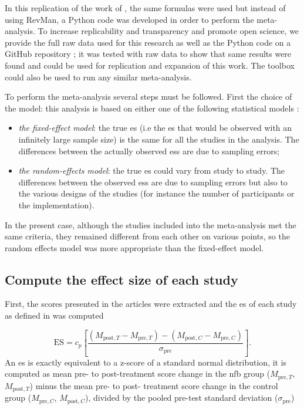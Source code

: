 \documentclass[12pt,a4paper,english]{article}
\begin{document}
In this replication of the work of \citeauthor{Cortese2016}, the same formulas were used \citep{Borenstein2009} but instead of using RevMan, 
a Python code was developed in order to perform the meta-analysis. To increase replicability and transparency and promote open science, we 
provide the full raw data used for this research as well as the Python code on a GitHub repository \citep{Bussalb2018}; it was tested
with \citet{Cortese2016} raw data to show that same results were found and could be used for replication and expansion of this work. The toolbox
could also be used to run any similar meta-analysis. 

To perform the meta-analysis several steps must be followed. First the choice of the model: this analysis is based on either one of the following 
statistical models \citep{Borenstein2009}:
\begin{itemize}
    \item \emph{the fixed-effect model}: the true \gls{es} (i.e the \gls{es} that would be observed with an infinitely 
		large sample size) is the same for all the studies in the analysis. The differences between the actually observed \gls{es}s 
		are due to sampling errors;
    \item \emph{the random-effects model}: the true \gls{es} could vary from study to study. The differences between the observed
		\glspl{es} are due to sampling errors but also to the various designs of the studies (for instance the number of participants or the implementation).
\end{itemize}

In the present case, although the studies included into the meta-analysis met the same criteria, they remained different from each other 
on various points, so the random effects model was more appropriate than the fixed-effect model.  

\subsection{Compute the effect size of each study}

First, the scores presented in the articles were extracted and the \gls{es} of each study as defined in \citet{Morris2008} 
was computed 

\begin{equation}
\label{eq:metareview_effect_size}
\text{ES} = c_p \left[ \frac{(M_{\text{post},T} - M_{\text{pre},T}) - (M_{\text{post},C} - M_{\text{pre},C}) }{\sigma_{\text{pre}}} \right ].
\end{equation} 
An \gls{es} is exactly equivalent to a z-score of a standard normal distribution, it is computed as mean pre- to post-treatment 
score change in the \gls{nfb} group ($M_{\text{pre},T}$, $M_{\text{post},T}$) minus the mean pre- to post- treatment score change 
in the control group ($M_{\text{pre},C}$, $M_{\text{post},C}$), divided by the pooled pre-test standard deviation ($\sigma_{\text{pre}}$) 
\end{document}

